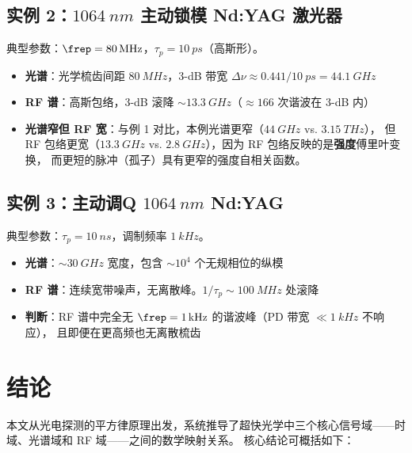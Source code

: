 \documentclass[11pt,a4paper]{article}
\begin{document}
\subsection{实例 2：$\SI{1064}{nm}$ 主动锁模 Nd:YAG 激光器}

典型参数：$\frep = \SI{80}{MHz}$，$\tau_p = \SI{10}{ps}$（高斯形）。

\begin{itemize}
    \item \textbf{光谱}：光学梳齿间距 $\SI{80}{MHz}$，3-dB 带宽 $\Delta\nu \approx 0.441/\SI{10}{ps} = \SI{44.1}{GHz}$
    \item \textbf{RF 谱}：高斯包络，3-dB 滚降 $\sim\SI{13.3}{GHz}$（$\approx 166$ 次谐波在 3-dB 内）
    \item \textbf{光谱窄但 RF 宽}：与例 1 对比，本例光谱更窄（$\SI{44}{GHz}$ vs. $\SI{3.15}{THz}$），
    但 RF 包络更宽（$\SI{13.3}{GHz}$ vs. $\SI{2.8}{GHz}$），因为 RF 包络反映的是\textbf{强度}傅里叶变换，
    而更短的脉冲（孤子）具有更窄的强度自相关函数。
\end{itemize}

\subsection{实例 3：主动调Q $\SI{1064}{nm}$ Nd:YAG}

典型参数：$\tau_p = \SI{10}{ns}$，调制频率 $\SI{1}{kHz}$。

\begin{itemize}
    \item \textbf{光谱}：$\sim\SI{30}{GHz}$ 宽度，包含 $\sim 10^4$ 个无规相位的纵模
    \item \textbf{RF 谱}：连续宽带噪声，无离散峰。$1/\tau_p \sim \SI{100}{MHz}$ 处滚降
    \item \textbf{判断}：RF 谱中完全无 $\frep = \SI{1}{kHz}$ 的谐波峰（PD 带宽 $\ll \SI{1}{kHz}$ 不响应），
    且即便在更高频也无离散梳齿
\end{itemize}

\section{结论}

本文从光电探测的平方律原理出发，系统推导了超快光学中三个核心信号域——时域、光谱域和 RF 域——之间的数学映射关系。
核心结论可概括如下：
\end{document}
